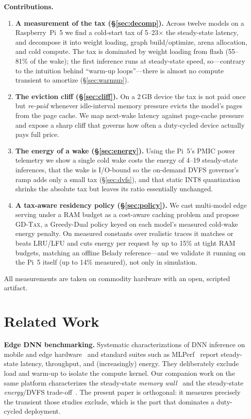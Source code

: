 \documentclass[journal]{IEEEtran}
\newcommand{\gdtax}{\textsc{GD-Tax}}
\begin{document}
\noindent\textbf{Contributions.}
\begin{enumerate}
\item \textbf{A measurement of the tax (\S\ref{sec:decomp}).} Across twelve models on a
Raspberry~Pi~5 we find a cold-start tax of 5--23$\times$ the steady-state latency, and decompose
it into weight loading, graph build/optimize, arena allocation, and cold compute. The tax is
dominated by weight loading from flash (55--81\% of the wake); the first inference runs at
steady-state speed, so---contrary to the intuition behind ``warm-up loops''---there is almost no
compute transient to amortize (\S\ref{sec:warmup}).
\item \textbf{The eviction cliff (\S\ref{sec:cliff}).} On a 2\,GB device the tax is not paid
once but \emph{re-paid} whenever idle-interval memory pressure evicts the model's pages from the
page cache. We map next-wake latency against page-cache pressure and expose a sharp cliff that
governs how often a duty-cycled device actually pays full price.
\item \textbf{The energy of a wake (\S\ref{sec:energy}).} Using the Pi~5's PMIC power telemetry
we show a single cold wake costs the energy of 4--19 steady-state inferences, that
the wake is I/O-bound so the on-demand DVFS governor's ramp adds only a small tax
(\S\ref{sec:dvfs}), and that static INT8 quantization shrinks the absolute tax but leaves its
ratio essentially unchanged.
\item \textbf{A tax-aware residency policy (\S\ref{sec:policy}).} We cast multi-model edge
serving under a RAM budget as a cost-aware caching problem and propose \gdtax{}, a Greedy-Dual
policy keyed on each model's measured cold-wake energy penalty. On measured constants over
realistic traces it matches or beats LRU/LFU and cuts energy per request by up to 15\% at
tight RAM budgets, matching an offline Belady reference---and we validate it running on the
Pi~5 itself (up to 14\% measured), not only in simulation.
\end{enumerate}
All measurements are taken on commodity hardware with an open, scripted artifact.

\section{Related Work}\label{sec:related}
\textbf{Edge DNN benchmarking.} Systematic characterizations of DNN inference on mobile and edge
hardware~\cite{bianco2018benchmark,lane2016deepx,xu2019firstlook} and standard suites such as
MLPerf~\cite{reddi2020mlperf} report steady-state latency, throughput, and (increasingly) energy.
They deliberately exclude load and warm-up to isolate the compute kernel. Our companion work on
the same platform characterizes the steady-state \emph{memory wall}~\cite{jacob2026memwall} and
the steady-state \emph{energy}/DVFS trade-off~\cite{jacob2026energy}. The present paper is
orthogonal: it measures precisely the transient those studies exclude, which is the part that
dominates a duty-cycled deployment.
\end{document}
